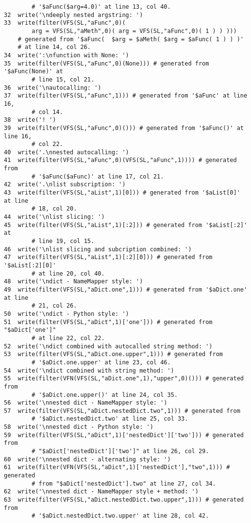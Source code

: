 \begin{verbatim}
        # '$aFunc($arg=4.0)' at line 13, col 40.
32  write('\ndeeply nested argstring: ')
33  write(filter(VFS(SL,"aFunc",0)(  
        arg = VFS(SL,"aMeth",0)( arg = VFS(SL,"aFunc",0)( 1 ) ) ))) 
	# generated from '$aFunc(  $arg = $aMeth( $arg = $aFunc( 1 ) ) )' 
	# at line 14, col 26.
34  write(':\nfunction with None: ')
35  write(filter(VFS(SL,"aFunc",0)(None))) # generated from '$aFunc(None)' at 
        # line 15, col 21.
36  write('\nautocalling: ')
37  write(filter(VFS(SL,"aFunc",1))) # generated from '$aFunc' at line 16, 
        # col 14.
38  write('! ')
39  write(filter(VFS(SL,"aFunc",0)())) # generated from '$aFunc()' at line 16, 
        # col 22.
40  write('.\nnested autocalling: ')
41  write(filter(VFS(SL,"aFunc",0)(VFS(SL,"aFunc",1)))) # generated from 
        # '$aFunc($aFunc)' at line 17, col 21.
42  write('.\nlist subscription: ')
43  write(filter(VFS(SL,"aList",1)[0])) # generated from '$aList[0]' at line 
        # 18, col 20.
44  write('\nlist slicing: ')
45  write(filter(VFS(SL,"aList",1)[:2])) # generated from '$aList[:2]' at 
        # line 19, col 15.
46  write('\nlist slicing and subcription combined: ')
47  write(filter(VFS(SL,"aList",1)[:2][0])) # generated from '$aList[:2][0]' 
        # at line 20, col 40.
48  write('\ndict - NameMapper style: ')
49  write(filter(VFS(SL,"aDict.one",1))) # generated from '$aDict.one' at line
        # 21, col 26.
50  write('\ndict - Python style: ')
51  write(filter(VFS(SL,"aDict",1)['one'])) # generated from "$aDict['one']" 
        # at line 22, col 22.
52  write('\ndict combined with autocalled string method: ')
53  write(filter(VFS(SL,"aDict.one.upper",1))) # generated from 
        # '$aDict.one.upper' at line 23, col 46.
54  write('\ndict combined with string method: ')
55  write(filter(VFN(VFS(SL,"aDict.one",1),"upper",0)())) # generated from 
        # '$aDict.one.upper()' at line 24, col 35.
56  write('\nnested dict - NameMapper style: ')
57  write(filter(VFS(SL,"aDict.nestedDict.two",1))) # generated from 
        # '$aDict.nestedDict.two' at line 25, col 33.
58  write('\nnested dict - Python style: ')
59  write(filter(VFS(SL,"aDict",1)['nestedDict']['two'])) # generated from 
        # "$aDict['nestedDict']['two']" at line 26, col 29.
60  write('\nnested dict - alternating style: ')
61  write(filter(VFN(VFS(SL,"aDict",1)['nestedDict'],"two",1))) # generated 
        # from "$aDict['nestedDict'].two" at line 27, col 34.
62  write('\nnested dict - NameMapper style + method: ')
63  write(filter(VFS(SL,"aDict.nestedDict.two.upper",1))) # generated from 
        # '$aDict.nestedDict.two.upper' at line 28, col 42.

\end{verbatim}
